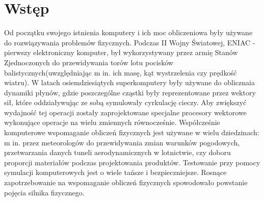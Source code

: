   \section{Wstęp}\label{sec:wstep}
Od początku swojego istnienia komputery i ich moc obliczeniowa były
używane do rozwiązywania problemów fizycznych. Podczas II Wojny Światowej, ENIAC
- pierwszy elektroniczny komputer, był wykorzystywany przez armię Stanów Zjednoczonych do
przewidywania torów lotu pocisków balistycznych(uwzględniając m in. ich masę,
kąt wystrzelenia czy prędkość wiatru). W latach osiemdziesiątych superkomputery
były używane do oblicznaia dynamiki płynów, gdzie poszczególne cząstki były
reprezentowane przez wektory sił, które oddziaływując ze sobą symulowały
cyrkulację cieczy. Aby zwiększyć wydajność tej operacji zostały zaprojektowane
specjalne procesory wektorowe wykonujące operacje na wielu zmiennych
równocześnie. Współcześnie komputerowe wspomaganie obliczeń fizycznych jest
używane w wielu dziedzinach: m in. przez meteorologów do przewidywania zmian
warunków pogodowych, przetwarzania danych tuneli aerodynamicznych w lotnictwie,
czy doboru proporcji materiałów podczas projektowania produktów. Testowanie przy
pomocy symulacji komputerowych jest o wiele tańsze i bezpieczniejsze. Rosnące
zapotrzebowanie na wspomaganie obliczeń fizycznych spowodowało powstanie pojęcia
silnika fizycznego.
